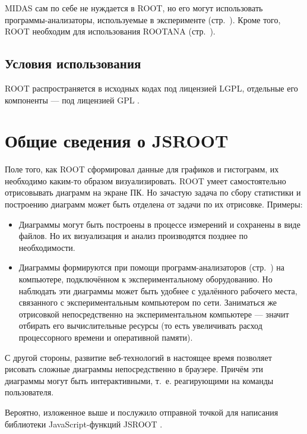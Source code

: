 \documentclass[12pt, a4paper, oneside, onecolumn]{book}
\newcommand{\MIDAS}{\mbox{MIDAS}}
\newcommand{\ROOT}{\mbox{ROOT}}
\newcommand{\ROOTJS}{\mbox{JSROOT}}
\newcommand{\ROOTANA}{\mbox{ROOTANA}}
\begin{document}
\MIDAS{} сам по себе не нуждается в \ROOT{}, но его могут использовать программы-анализаторы, используемые в эксперименте (стр.~\pageref{sec-midas-analyzer}). Кроме того, \ROOT{} необходим для использования \ROOTANA{} (стр.~\pageref{sec-rootana}).

\subsection{Условия использования}

\ROOT{} распространяется в исходных кодах под лицензией LGPL, отдельные его компоненты --- под лицензией GPL \cite{RootLicense}.

\section{Общие сведения о \ROOTJS{}}

Поле того, как \ROOT{} сформировал данные для графиков и гистограмм, их необходимо каким-то образом визуализировать. \ROOT{} умеет самостоятельно отрисовывать диаграмм на экране ПК. Но зачастую задача по сбору статистики и построению диаграмм может быть отделена от задачи по их отрисовке. Примеры:

\begin{itemize}

\item Диаграммы могут быть построены в процессе измерений и сохранены в виде файлов. Но их визуализация и анализ производятся позднее по необходимости.

\item Диаграммы формируются при помощи программ-анализаторов (стр.~\pageref{sec-midas-analyzer}) на компьютере, подключённом к экспериментальному оборудованию. Но наблюдать эти диаграммы может быть удобнее с удалённого рабочего места, связанного с экспериментальным компьютером по сети. Заниматься же отрисовкой непосредственно на экспериментальном компьютере --- значит отбирать его вычислительные ресурсы (то есть увеличивать расход процессорного времени и оперативной памяти).

\end{itemize}

С другой стороны, развитие веб-технологий в настоящее время позволяет рисовать сложные диаграммы непосредственно в браузере. Причём эти диаграммы могут быть интерактивными, т.~е. реагирующими на команды пользователя.

Вероятно, изложенное выше и послужило отправной точкой для написания библиотеки JavaScript-функций \ROOTJS{} \cite{JsRootHome}.
\end{document}
